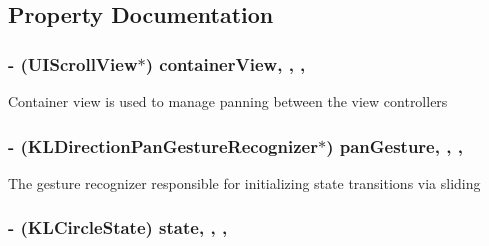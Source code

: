 \subsection{Property Documentation}
\hypertarget{category_k_l_circle_view_controller_07_08_aa61407e92c0eb840867605fdb6b3a85a}{
\subsubsection[{container\-View}]{\setlength{\rightskip}{0pt plus 5cm}-\/ (U\-I\-Scroll\-View$\ast$) container\-View\hspace{0.3cm}{\ttfamily [read]}, {\ttfamily [write]}, {\ttfamily [nonatomic]}, {\ttfamily [strong]}}}\label{category_k_l_circle_view_controller_07_08_aa61407e92c0eb840867605fdb6b3a85a}
Container view is used to manage panning between the view controllers \hypertarget{category_k_l_circle_view_controller_07_08_a344f3783a467601e34381eed50817d84}{
\subsubsection[{pan\-Gesture}]{\setlength{\rightskip}{0pt plus 5cm}-\/ ({\bf K\-L\-Direction\-Pan\-Gesture\-Recognizer}$\ast$) pan\-Gesture\hspace{0.3cm}{\ttfamily [read]}, {\ttfamily [write]}, {\ttfamily [nonatomic]}, {\ttfamily [strong]}}}\label{category_k_l_circle_view_controller_07_08_a344f3783a467601e34381eed50817d84}
The gesture recognizer responsible for initializing state transitions via sliding \hypertarget{category_k_l_circle_view_controller_07_08_a0dcfb71e23f52a4f8b0dce53fa86a49f}{
\subsubsection[{state}]{\setlength{\rightskip}{0pt plus 5cm}-\/ (K\-L\-Circle\-State) state\hspace{0.3cm}{\ttfamily [read]}, {\ttfamily [write]}, {\ttfamily [nonatomic]}, {\ttfamily [assign]}}}\label{category_k_l_circle_view_controller_07_08_a0dcfb71e23f52a4f8b0dce53fa86a49f}
